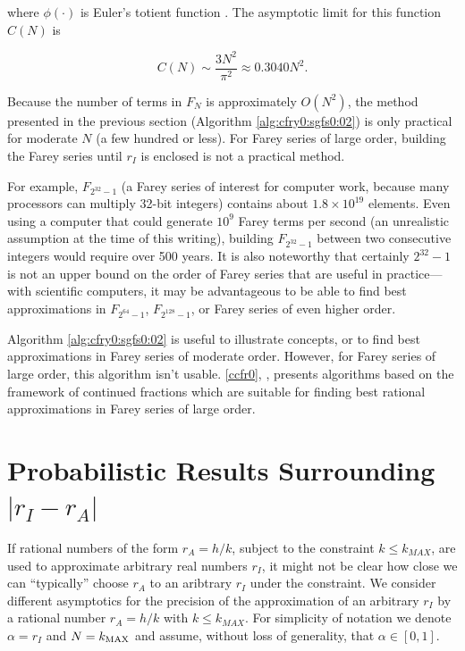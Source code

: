 \noindent{}where $\phi(\cdot{})$ is Euler's totient 
function \cite{bibref:w:PkuCnFareyPage}.  The 
asymptotic limit for this function $C(N)$ is

\begin{equation}
C(N) \sim{} \frac{3 N^2}{\pi{}^2} \approx 0.3040 N^2 .
\end{equation}

Because the number of terms in $F_N$ is approximately 
$O(N^2)$, the method presented in the previous section 
(Algorithm \ref{alg:cfry0:sgfs0:02}) is
only practical for moderate $N$ (a few hundred or less).  For Farey
series of large order, building the Farey series until $r_I$ is
enclosed is not a practical method.

For example, $F_{2^{32}-1}$ (a Farey series of interest for
computer work, because many processors can multiply 32-bit integers)
contains about $1.8 \times 10^{19}$ elements.  Even using a computer
that could generate $10^{9}$ Farey terms per second (an unrealistic
assumption at the time of this writing), building
$F_{2^{32}-1}$ between two consecutive integers would require over 500
years.  It is also noteworthy that certainly $2^{32}-1$ is not an upper
bound on the order of Farey series that are useful in practice---with
scientific computers, it may be advantageous to be able to find best
approximations in $F_{2^{64}-1}$, $F_{2^{128}-1}$, or Farey series
of even higher order.

Algorithm \ref{alg:cfry0:sgfs0:02} is useful to illustrate concepts, or
to find best approximations in Farey series of moderate order.  However,
for Farey series of large order, this algorithm isn't usable.  
\ccfrzeroxrefcomma{}\ccfrzeromcclass{} \ref{ccfr0}, 
\emph{\ccfrzeroshorttitle{}}, presents algorithms based on the framework
of continued fractions which are suitable for finding best rational
approximations in Farey series of large order.


\section[Probabilistic Results Surrounding $| r_I - r_A |$]
        {Probabilistic Results Surrounding \mbox{\boldmath $| r_I - r_A |$}}

If rational numbers of the form $r_A = h/k$, subject to the constraint
$k \leq k_{MAX}$, are used to approximate arbitrary real numbers
$r_I$, it might not be clear how close we can ``typically'' choose
$r_A$ to an aribtrary $r_I$ under the constraint.
We consider different asymptotics for
the precision of the approximation of an arbitrary $r_I$ by a
rational number
$r_A=h/k$ with $k \leq k_{MAX}$. For simplicity of notation
we
denote $\alpha= r_I$ and $N=k_{ \rm MAX }$ and assume, without
loss of generality, that
$ \alpha \in [0,1]$.

